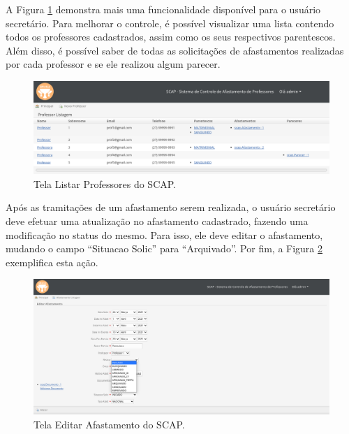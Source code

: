 A Figura \ref{fig-projeto-listar-professores} demonstra mais uma funcionalidade disponível para o usuário secretário. Para melhorar o controle, é possível visualizar uma lista contendo todos os professores cadastrados, assim como os seus respectivos parentescos. Além disso, é possível saber de todas as solicitações de afastamentos realizadas por cada professor e se ele realizou algum parecer.  

\begin{figure}[h]
	\centering
	\includegraphics[scale=0.33]{figuras/fig-projeto-listar-professores} 
	\caption{Tela Listar Professores do SCAP.}
	\label{fig-projeto-listar-professores}
\end{figure}

Após as tramitações de um afastamento serem realizada, o usuário secretário deve efetuar uma atualização no afastamento cadastrado, fazendo uma modificação no status do mesmo. Para isso, ele deve editar o afastamento, mudando o campo ``Situacao Solic'' para ``Arquivado''. Por fim, a Figura \ref{fig-projeto-editar-afastamento} exemplifica esta ação.

\begin{figure}[h]
	\centering
	\includegraphics[scale=0.33]{figuras/fig-projeto-editar-afastamento} 
	\caption{Tela Editar Afastamento do SCAP.}
	\label{fig-projeto-editar-afastamento}
\end{figure}

